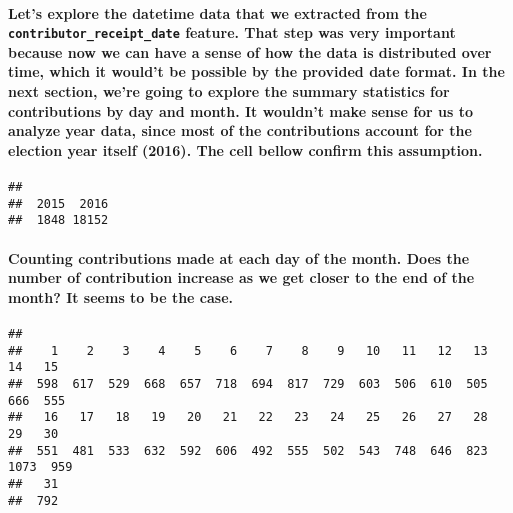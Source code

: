 \documentclass[]{article}
\let\oldparagraph\paragraph
\renewcommand{\paragraph}[1]{\oldparagraph{#1}\mbox{}}
\begin{document}
\paragraph{\texorpdfstring{Let's explore the datetime data that we
extracted from the \texttt{contributor\_receipt\_date} feature. That
step was very important because now we can have a sense of how the data
is distributed over time, which it would't be possible by the provided
date format. In the next section, we're going to explore the summary
statistics for contributions by day and month. It wouldn't make sense
for us to analyze year data, since most of the contributions account for
the election year itself (2016). The cell bellow confirm this
assumption.}{Let's explore the datetime data that we extracted from the contributor\_receipt\_date feature. That step was very important because now we can have a sense of how the data is distributed over time, which it would't be possible by the provided date format. In the next section, we're going to explore the summary statistics for contributions by day and month. It wouldn't make sense for us to analyze year data, since most of the contributions account for the election year itself (2016). The cell bellow confirm this assumption.}}\label{lets-explore-the-datetime-data-that-we-extracted-from-the-contributor_receipt_date-feature.-that-step-was-very-important-because-now-we-can-have-a-sense-of-how-the-data-is-distributed-over-time-which-it-wouldt-be-possible-by-the-provided-date-format.-in-the-next-section-were-going-to-explore-the-summary-statistics-for-contributions-by-day-and-month.-it-wouldnt-make-sense-for-us-to-analyze-year-data-since-most-of-the-contributions-account-for-the-election-year-itself-2016.-the-cell-bellow-confirm-this-assumption.}

\begin{verbatim}
## 
##  2015  2016 
##  1848 18152
\end{verbatim}

\paragraph{Counting contributions made at each day of the month. Does
the number of contribution increase as we get closer to the end of the
month? It seems to be the
case.}\label{counting-contributions-made-at-each-day-of-the-month.-does-the-number-of-contribution-increase-as-we-get-closer-to-the-end-of-the-month-it-seems-to-be-the-case.}

\begin{verbatim}
## 
##    1    2    3    4    5    6    7    8    9   10   11   12   13   14   15 
##  598  617  529  668  657  718  694  817  729  603  506  610  505  666  555 
##   16   17   18   19   20   21   22   23   24   25   26   27   28   29   30 
##  551  481  533  632  592  606  492  555  502  543  748  646  823 1073  959 
##   31 
##  792
\end{verbatim}
\end{document}
